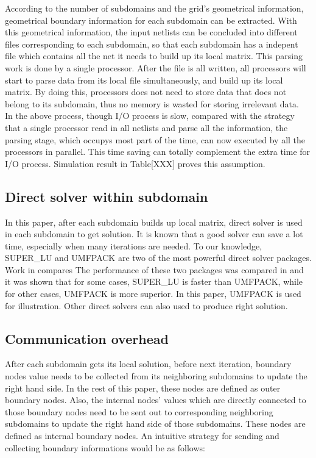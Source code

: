 \documentclass{sig-alternate}
\begin{document}
	According to the number of subdomains and the grid's geometrical information, geometrical boundary information for each
	subdomain can be extracted. With this geometrical information, the input netlists can be concluded into different files
	corresponding to each subdomain, so that each subdomain has a indepent file which contains all the net it needs to build up
	its local matrix. This parsing work is done by a single processor. After the file is all written, all processors will start to
	parse data from its local file simultaneously, and build up its local matrix. By doing this, processors does not need to store
	data that does not belong to its subdomain, thus no memory is wasted for storing irrelevant data. \\

	In the above process, though I/O process is slow, compared with the strategy that a single processor read in all netlists and
	parse all the information, the parsing stage, which occupys most part of the time, can now executed by all the processors 
	in parallel. This time saving can totally complement the extra time for I/O process. Simulation result in Table[XXX] proves this
	assumption.\\
	 
   \subsection{Direct solver within subdomain}
	In this paper, after each subdomain builds up local matrix, direct solver is used in each subdomain to get solution. It is known
	that a good solver can save a lot time, especially when many iterations are needed. To our knowledge, SUPER\_LU and UMFPACK are 
	two of the most powerful direct solver packages. Work in\cite{package} compares The performance of these two packages was compared
	in\cite{package} and it was shown that for some cases, SUPER\_LU is faster than UMFPACK, while for other cases, UMFPACK is more 
	superior. In this paper, UMFPACK is used for illustration. Other direct solvers can also used to produce right solution.\\

    \subsection{Communication overhead}
	After each subdomain gets its local solution, before next iteration, boundary nodes value needs to be collected from its 
	neighboring subdomains to update
	the right hand side. In the rest of this paper, these nodes are defined as outer boundary nodes. Also, the internal nodes' 
	values which are directly connected to those boundary nodes need to be sent out
	to corresponding neighboring subdomains to update the right hand side of those subdomains. These nodes are defined as internal
	boundary nodes. An intuitive strategy for sending and collecting boundary informations would be as follows:\\
\end{document}
